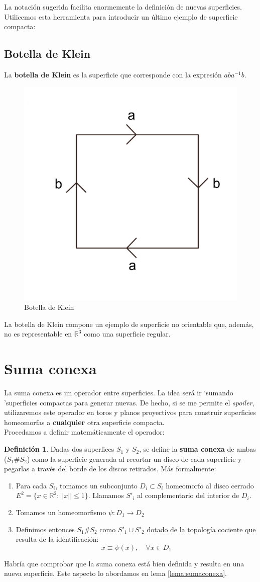 \documentclass[a4paper,11pt,spanish, twoside, leqno]{tfg-uam}
\newcommand*{\reales}{\mathbb{R}}
\theoremstyle{definition}
\newtheorem{defin}[teor]{Definici\'on}
\begin{document}
La notación sugerida facilita enormemente la definición de nuevas superficies. Utilicemos esta herramienta para introducir un último ejemplo de superficie compacta:


\subsection*{Botella de Klein}
La \textbf{botella de Klein} es la superficie que corresponde con la expresión $ aba^{-1}b $.
\begin{figure}[h!]
	\centering
	\includegraphics[width=0.2\linewidth]{imagenes/klein.png}
	\caption{Botella de Klein}
	\label{fig:botelladeklein expresion canónica}
\end{figure} 

La botella de Klein compone un ejemplo de superficie no orientable que, además, no es representable en $\reales^3$ como una superficie regular.

\section{Suma conexa}

La suma conexa es un operador entre superficies. La idea será ir \textquoteleft sumando \textquoteright superficies compactas para generar nuevas. De hecho, si se me permite el \textit{spoiler}, utilizaremos este operador en toros y planos proyectivos para construir superficies homeomorfas a \textbf{cualquier} otra superficie compacta.\\
Procedamos a definir matemáticamente el operador:

\begin{defin}\label{defin:sumaconexa}
Dadas dos superfices $S_1$ y $S_2$, se define la \textbf{suma conexa} de ambas ($S_1\#S_2$) como la superficie generada al recortar un disco de cada superficie y pegarlas a través del borde de los discos retirados. Más formalmente:
\begin{enumerate}
\item  Para cada $S_i$, tomamos un subconjunto $D_i\subset S_i$ homeomorfo al disco cerrado $E^2=\{x\in\mathbb{R}^2: ||x||\leq 1\}$. Llamamos $S'_i$ al complementario del interior de $D_i$.

\item Tomamos un homeomorfismo $\psi:D_1\longrightarrow D_2$

\item Definimos entonces $S_1\#S_2$ como $S'_1\cup S'_2$ dotado de la topología cociente que resulta de la identificación:
\[ x \equiv  \psi(x), \quad \forall x \in D_1 \] 
\end{enumerate}
Habría que comprobar que la suma conexa está bien definida y resulta en una nueva superficie. Este aspecto lo abordamos en lema \ref{lema:sumaconexa}.
\end{defin}
\end{document}
